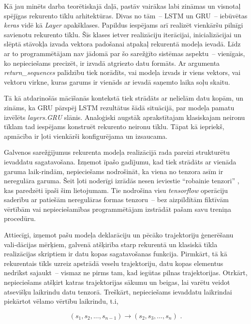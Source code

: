 \documentclass[12pt, a4paper]{article}
\numberwithin{equation}{section} %
\begin{document}
Kā jau minēts darba teorētiskajā daļā, pastāv vairākas labi zināmas un visnotaļ spējīgas rekurento tīklu arhitektūras. Divas no tām~-- LSTM un GRU~-- iebūvētas \textit{keras} vidē kā \textit{Layer} apakšklases. Papildus iespējams arī realizēt vienkāršu pilnīgi savienotu rekurento tīklu. Šīs klases ietver realizāciju iterācijai, inicializācijai un slēptā stāvokļa izvada vektora padošanai atpakaļ rekurentā modeļa ievadā. Līdz ar to programmētājam nav jādomā par šo sarežģīto sistēmas aspektu~-- vienīgais, ko nepieciešams precizēt, ir izvadā atgriezto datu formāts. Ar argumenta \textit{return\_sequences} palīdzību tiek norādīts, vai modeļa izvads ir viens vektors, vai vektoru virkne, kuras garums ir vienāds ar ievadā saņemto laika soļu skaitu.

Tā kā atdarinošās mācīšanās kontekstā tiek strādāts ar nelielām datu kopām, un zināms, ka GRU pārspēj LSTM rezultātus šādā situācijā, par modeļa pamatu izvēlēts \textit{layers.GRU} slānis. Analoģiski augstāk aprakstītajam klasiskajam neironu tīklam tad iespējams konstruēt rekurento neironu tīklu. Tāpat kā iepriekš, apmācība ir ļoti vienkārši konfigurējama un izsaucama.

Galvenos sarežģījumus rekurenta modeļa realizācijā rada pareizi strukturētu ievaddatu sagatavošana. Izņemot īpašo gadījumu, kad tiek strādāts ar vienāda garuma laik-rindām, nepieciešams nodrošināt, ka viena no tenzora asīm ir neregulāra garuma. Šeit ļoti noderīgi izrādās nesen ieviestie ``robainie tenzori'' \cite{tf_ragged}, kas paredzēti īpaši šim lietojumam. Tie nodrošina visu \textit{tensorflow} operāciju saderību ar patiešām neregulāras formas tenzoru~-- bez aizpildītām fiktīvām vērtībām vai nepieciešamības programmētājam izstrādāt pašam savu treniņa procedūru.

Attiecīgi, izņemot pašu modeļa deklarāciju un pēcāko trajektoriju ģenerēšanu vali-dācijas mērķiem, galvenā atšķirība starp rekurentā un klasiskā tīkla realizācijas skriptiem ir datu kopas sagatavošanas funkcija. Pirmkārt, tā kā rekurentais tīkls uzreiz apstrādā veselu trajektoriju, datu kopas elementus nedrīkst sajaukt~-- vismaz ne pirms tam, kad iegūtas pilnas trajektorijas. Otrkārt, nepieciešams atšķirt katras trajektorijas sākumu un beigas, lai varētu veidot atsevišķu laikrindu datu tenzorā. Treškārt, nepieciešams ievaddatu laikrindai piekārtot vēlamo vērtību laikrindu, t.i,


\begin{equation}
    (s_1, s_2, ..., s_{n-1} ) \rightarrow (s_2, s_3, ..., s_n )
\text{ .}
\end{equation}
\end{document}
